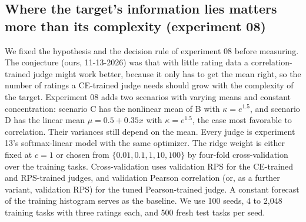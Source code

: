 \subsection{Where the target's information lies matters more than its complexity (experiment 08)}
\label{app:controlled-complexity}

We fixed the hypothesis and the decision rule of experiment 08 before measuring.
The conjecture (ours, 11-13-2026) was that with little rating data a correlation-trained judge might work better, because it only has to get the mean right, so the number of ratings a CE-trained judge needs should grow with the complexity of the target.
Experiment 08 adds two scenarios with varying means and constant concentration: scenario C has the nonlinear mean of B with $\kappa=e^{1.5}$, and scenario D has the linear mean $\mu=0.5+0.35x$ with $\kappa=e^{1.5}$, the case most favorable to correlation.
Their variances still depend on the mean.
Every judge is experiment 13's softmax-linear model with the same optimizer.
The ridge weight is either fixed at $c=1$ or chosen from $\{0.01,0.1,1,10,100\}$ by four-fold cross-validation over the training tasks.
Cross-validation uses validation RPS for the CE-trained and RPS-trained judges, and validation Pearson correlation (or, as a further variant, validation RPS) for the tuned Pearson-trained judge.
A constant forecast of the training histogram serves as the baseline.
We use 100 seeds, 4 to 2{,}048 training tasks with three ratings each, and 500 fresh test tasks per seed.

\begin{table}[t]
\caption{\textbf{Correlation training wins at low data only in scenario A, where the mean says little; in B, C and D the cross-entropy (CE)-trained judge wins from 12 ratings.}
Experiment 08, held-out test ranked probability score (RPS) excess (0 is best; lower is better) on 500 fresh tasks per seed, 100 seeds.
First column of results: training ratings at which the Pearson-trained judge (fixed ridge) is significantly better than the CE-trained judge (paired 95\% bootstrap interval of the difference of test RPS excess entirely below 0).
Second: the smallest size from which the CE-trained judge (fixed ridge) is significantly better at every larger size.
Third: the same comparison between the validation-tuned CE-trained judge and the validation-tuned Pearson-trained judge.
Ratings are three per task.
We chose each judge by L-BFGS-B (at most 400 iterations) from the training-histogram start; the Pearson objective is not convex, so its results reflect this optimizer, start and budget.}
\label{tab:exp08}
\centering\small

\end{table}

